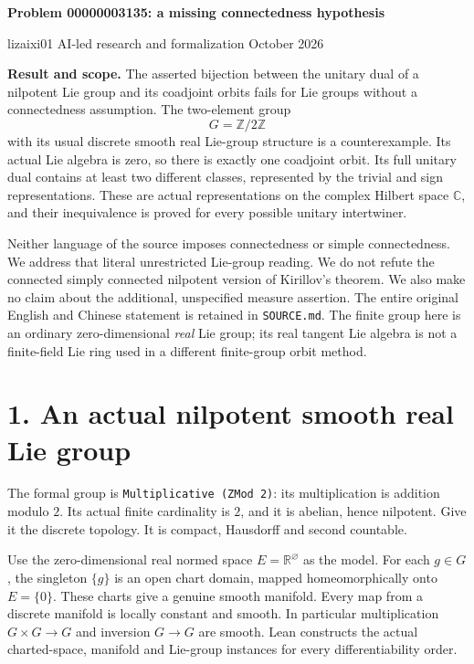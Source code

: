 \documentclass[10pt]{article}
\newcommand{\R}{\mathbb R}\newcommand{\C}{\mathbb C}
\begin{document}
\begin{center}
{\Large\bfseries Problem 00000003135: a missing connectedness hypothesis}

lizaixi01 \quad AI-led research and formalization  October 2026
\end{center}
\textbf{Result and scope.}
The asserted bijection between the unitary dual of a nilpotent Lie group and its coadjoint orbits fails for Lie groups without a connectedness assumption. The two-element group
\[
G=\mathbb Z/2\mathbb Z
\]
with its usual discrete smooth real Lie-group structure is a counterexample. Its actual Lie algebra is zero, so there is exactly one coadjoint orbit. Its full unitary dual contains at least two different classes, represented by the trivial and sign representations. These are actual representations on the complex Hilbert space $\C$, and their inequivalence is proved for every possible unitary intertwiner.

Neither language of the source imposes connectedness or simple connectedness. We address that literal unrestricted Lie-group reading. We do not refute the connected simply connected nilpotent version of Kirillov's theorem. We also make no claim about the additional, unspecified measure assertion. The entire original English and Chinese statement is retained in \texttt{SOURCE.md}. The finite group here is an ordinary zero-dimensional \emph{real} Lie group; its real tangent Lie algebra is not a finite-field Lie ring used in a different finite-group orbit method.

\section*{1. An actual nilpotent smooth real Lie group}
The formal group is \texttt{Multiplicative (ZMod 2)}: its multiplication is addition modulo $2$. Its actual finite cardinality is $2$, and it is abelian, hence nilpotent. Give it the discrete topology. It is compact, Hausdorff and second countable.

Use the zero-dimensional real normed space $E=\R^{\varnothing}$ as the model. For each $g\in G$, the singleton $\{g\}$ is an open chart domain, mapped homeomorphically onto $E=\{0\}$. These charts give a genuine smooth manifold. Every map from a discrete manifold is locally constant and smooth. In particular multiplication $G\times G\to G$ and inversion $G\to G$ are smooth. Lean constructs the actual charted-space, manifold and Lie-group instances for every differentiability order.
\end{document}
